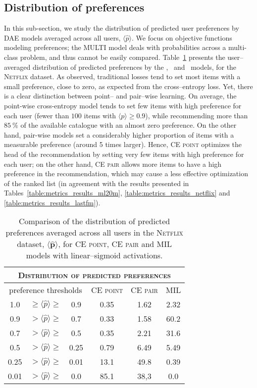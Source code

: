 \subsection{Distribution of preferences}
In this sub-section, we study the distribution of predicted user preferences by DAE models averaged across all users, $\langle \hat p\rangle$. We focus on objective functions modeling preferences; the \textsc{MULTI} model deals with probabilities across a multi-class problem, and thus cannot be easily compared. Table~\ref{tab:comparison_distributions} presents the user--averaged distribution of predicted preferences by the \CEpointlinsig, \CEpairlinsig\, and \MILlinsig\, models, for the \textsc{Netflix} dataset. As observed, traditional losses tend to set most items with a small preference, close to zero, as expected from the cross--entropy loss. Yet, there is a clear distinction between point-- and pair--wise learning. On average, the point-wise cross-entropy model tends to set few items with  high  preference for each user (fewer than $100$ items with $\langle p\rangle\ge0.9$), while recommending more than $85~\%$ of the available catalogue with an almost zero preference. On the other hand, pair-wise models set a considerably higher proportion of items with a measurable preference (around 5 times larger). Hence, 
\textsc{CE point} optimizes the head of the recommendation by setting very few items with high preference for each user; on the other hand, \textsc{CE pair} allows more items to have a high preference in the recommendation, which may cause a less effective optimization of the ranked list (in agreement with the results presented in Tables~\ref{table:metrics_results_ml20m}, \ref{table:metrics_results_netflix} and \ref{table:metrics_results_lastfm}). 

\begin{table}[h]
\begin{tabular}{c c c | c c c}
\multicolumn{6}{c}{\textsc{Distribution of predicted preferences}}
\\
\hline 
\hline
\multicolumn{3}{c}{preference thresholds} & \textsc{CE point} & \textsc{CE pair} & \textsc{MIL} \\
\hline 
1.0 & $\ge \langle\hat{p}\rangle \ge $ & 0.9   & 0.35 & 1.62 & 2.32 \\
0.9 &$ > \langle\hat{p}\rangle \ge $ & 0.7     & 0.33 & 1.58 & 60.2 \\
0.7 &$ > \langle\hat{p}\rangle \ge $ & 0.5     & 0.35 & 2.21 & 31.6 \\
0.5 &$ > \langle\hat{p}\rangle \ge $ & 0.25    & 0.79 & 6.49 & 5.49 \\
0.25 &$ > \langle\hat{p}\rangle \ge $ & 0.01   & 13.1 & 49.8 & 0.39 \\
0.01 &$ > \langle\hat{p}\rangle \ge $ & 0.0    & 85.1 & 38,3 & 0.0 \\
\hline
\end{tabular}
\caption{Comparison of the distribution of predicted preferences
averaged across all users in the \textsc{Netflix} dataset, $\boldsymbol{\langle\hat{p}\rangle}$, 
for \textsc{CE point}, \textsc{CE pair} and \textsc{MIL} models with  linear--sigmoid activations.}
\label{tab:comparison_distributions}
\end{table}

